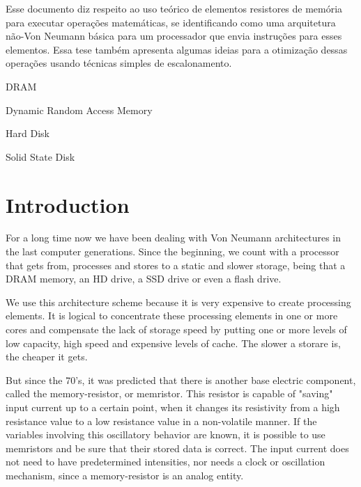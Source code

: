 \documentclass[ecp,tc,english]{iiufrgs}
\begin{document}
\begin{englishabstract}
Esse documento diz respeito ao uso teórico de elementos resistores de memória para executar operações matemáticas, se identificando como uma arquitetura não-Von Neumann básica para um processador que envia instruções para esses elementos. Essa tese também apresenta algumas ideias para a otimização dessas operações usando técnicas simples de escalonamento.
\end{englishabstract}

\begin{listofabbrv}{DRAM}
	\item[DRAM] Dynamic Random Access Memory
	\item[HD] Hard Disk
	\item[SSD] Solid State Disk
\end{listofabbrv}

\listoffigures

\listoftables

\tableofcontents


\chapter{Introduction}
For a long time now we have been dealing with Von Neumann architectures in the last computer generations. Since the beginning, we count with a processor that gets from, processes and stores to a static and slower storage, being that a DRAM memory, an HD drive, a SSD drive or even a flash drive.

We use this architecture scheme because it is very expensive to create processing elements. It is logical to concentrate these processing elements in one or more cores and compensate the lack of storage speed by putting one or more levels of low capacity, high speed and expensive levels of cache. The slower a storare is, the cheaper it gets.

But since the 70's, it was predicted that there is another base electric component, called the memory-resistor, or memristor. This resistor is capable of "saving" input current up to a certain point, when it changes its resistivity from a high resistance value to a low resistance value in a non-volatile manner. If the variables involving this oscillatory behavior are known, it is possible to use memristors and be sure that their stored data is correct. The input current does not need to have predetermined intensities, nor needs a clock or oscillation mechanism, since a memory-resistor is an analog entity.
\end{document}
